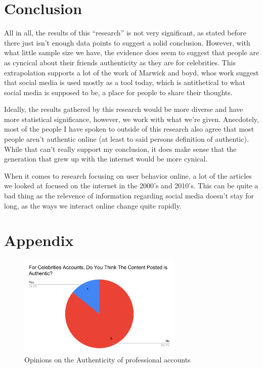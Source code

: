 \documentclass[12pt]{article}
\begin{document}
\begin{doublespace}
\section*{Conclusion}
    \par All in all, the results of this ``research'' is not very significant, as stated before there just isn't enough data points to suggest a solid conclusion.
        However, with what little sample size we have, the evidence does seem to suggest that people are as cyncical about their friends authenticity as they are for celebrities. 
        This extrapolation supports a lot of the work of Marwick and boyd, whos work suggest that social media is used mostly as a tool today, which is antithetical to what social media is supposed to be, a place for people to share their thoughts.
    \par Ideally, the results gathered by this research would be more diverse and have more statistical significance, however, we work with what we're given. 
        Anecdotely, most of the people I have spoken to outside of this research also agree that most people aren't authentic online (at least to said persons definition of authentic).
        While that can't really support my conclusion, it does make sense that the generation that grew up with the internet would be more cynical.
    \par When it comes to research focusing on user behavior online, a lot of the articles we looked at focused on the internet in the 2000's and 2010's. This can be quite a bad thing as the relevence of information regarding social media doesn't stay for long, as the ways we interact online change quite rapidly. 





    \newpage
    \section*{Appendix}
    \label{sec:appendix}
    \begin{figure}[h]
        \includegraphics[width=0.7\textwidth]{For Celebrities Accounts, Do You Think The Content Posted is Authentic_.pdf}
        \centering
        \caption{Opinions on the Authenticity of professional accounts}
        \label{fig:chart2}
    \end{figure}


\end{doublespace}
\end{document}
